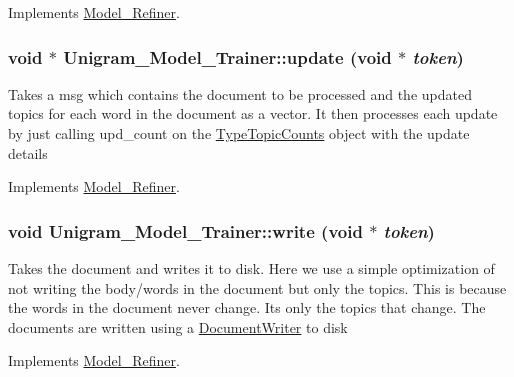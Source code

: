 Implements \hyperlink{class_model___refiner_a5aeef4eee7a0d4f1878356d891ded76d}{Model\_\-Refiner}.

\hypertarget{class_unigram___model___trainer_af9031fc304f82bb2f9209c0913f36df6}{
\subsubsection[{update}]{\setlength{\rightskip}{0pt plus 5cm}void $\ast$ Unigram\_\-Model\_\-Trainer::update (void $\ast$ {\em token})}}
\label{class_unigram___model___trainer_af9031fc304f82bb2f9209c0913f36df6}
Takes a msg which contains the document to be processed and the updated topics for each word in the document as a vector. It then processes each update by just calling upd\_\-count on the \hyperlink{class_type_topic_counts}{TypeTopicCounts} object with the update details 

Implements \hyperlink{class_model___refiner_a5766465773d95e73a36dac702cfe2298}{Model\_\-Refiner}.

\hypertarget{class_unigram___model___trainer_aab907b06b666d441ec60c4703d2a8e4e}{
\subsubsection[{write}]{\setlength{\rightskip}{0pt plus 5cm}void Unigram\_\-Model\_\-Trainer::write (void $\ast$ {\em token})}}
\label{class_unigram___model___trainer_aab907b06b666d441ec60c4703d2a8e4e}
Takes the document and writes it to disk. Here we use a simple optimization of not writing the body/words in the document but only the topics. This is because the words in the document never change. Its only the topics that change. The documents are written using a \hyperlink{class_document_writer}{DocumentWriter} to disk 

Implements \hyperlink{class_model___refiner_a7a98ac7633d5d15d959d9b9c1a414576}{Model\_\-Refiner}.



